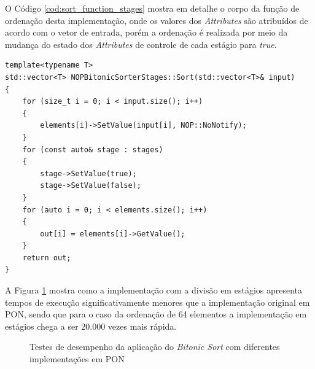 O Código \ref{cod:sort_function_stages} mostra em detalhe o corpo da função de
ordenação desta implementação, onde os valores dos \textit{Attributes} são
atribuídos de acordo com o vetor de entrada, porém a ordenação é realizada por
meio da mudança do estado dos \textit{Attributes} de controle de cada estágio
para \textit{true}.

\begin{lstlisting}[caption = {Trecho de código da estrutura NOPBitonicSorterStages},
  source = {Autoria própria}, float=htb,
  label = {cod:sort_function_stages}]
template<typename T>
std::vector<T> NOPBitonicSorterStages::Sort(std::vector<T>& input)
{
    for (size_t i = 0; i < input.size(); i++)
    {
        elements[i]->SetValue(input[i], NOP::NoNotify);
    }
    for (const auto& stage : stages)
    {
        stage->SetValue(true);
        stage->SetValue(false);
    }
    for (auto i = 0; i < elements.size(); i++)
    {
        out[i] = elements[i]->GetValue();
    }
    return out;
}
\end{lstlisting}

\FloatBarrier

A Figura \ref{fig:bitonic_bench_nop} mostra como a implementação com a divisão
em estágios apresenta tempos de execução significativamente menores que a
implementação original em PON, sendo que para o caso da ordenação de 64
elementos a implementação em estágios chega a ser 20.000 vezes mais rápida.

\begin{figure}[!htb]
\centering
{}
\caption{Testes de desempenho da aplicação do \textit{Bitonic Sort} com
diferentes implementações em PON}
\label{fig:bitonic_bench_nop}
\end{figure}

